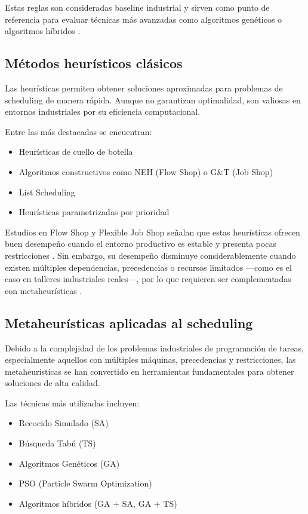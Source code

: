 Estas reglas son consideradas baseline industrial y sirven como punto de referencia para evaluar técnicas más avanzadas como algoritmos genéticos o algoritmos híbridos \cite{meisel2010}.

\subsection{Métodos heurísticos clásicos}

Las heurísticas permiten obtener soluciones aproximadas para problemas de scheduling de manera rápida. Aunque no garantizan optimalidad, son valiosas en entornos industriales por su eficiencia computacional.

Entre las más destacadas se encuentran:
\begin{itemize}
    \item Heurísticas de cuello de botella
    \item Algoritmos constructivos como NEH (Flow Shop) o G\&T (Job Shop)
    \item List Scheduling
    \item Heurísticas parametrizadas por prioridad
\end{itemize}
Estudios en Flow Shop y Flexible Job Shop señalan que estas heurísticas ofrecen buen desempeño cuando el entorno productivo es estable y presenta pocas restricciones \cite{flowshop,flexjobshop}. Sin embargo, su desempeño disminuye considerablemente cuando existen múltiples dependencias, precedencias o recursos limitados —como es el caso en talleres industriales reales—, por lo que requieren ser complementadas con metaheurísticas \cite{meisel2010}.

\subsection{Metaheurísticas aplicadas al scheduling}

Debido a la complejidad de los problemas industriales de programación de tareas, especialmente aquellos con múltiples máquinas, precedencias y restricciones, las metaheurísticas se han convertido en herramientas fundamentales para obtener soluciones de alta calidad.

Las técnicas más utilizadas incluyen:
\begin{itemize}
    \item Recocido Simulado (SA)
    \item Búsqueda Tabú (TS)
    \item Algoritmos Genéticos (GA)
    \item PSO (Particle Swarm Optimization)
    \item Algoritmos híbridos (GA + SA, GA + TS)
\end{itemize}

